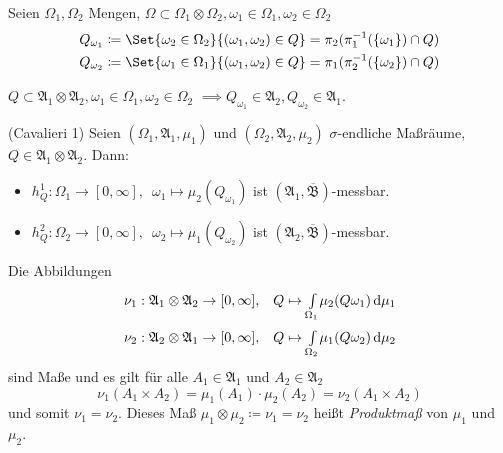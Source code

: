 \documentclass{cheat-sheet}
\newcommand{\Alg}{\mathfrak{A}} %
\newcommand{\Bor}{\mathfrak{B}} %
\begin{document}
\begin{nota}
  Seien $\Omega_1, \Omega_2$ Mengen, $\Omega \subset \Omega_1 \otimes \Omega_2, \omega_1 \in \Omega_1, \omega_2 \in \Omega_2$
  \begin{align*}
    Q_{\omega_1} &\coloneqq \Set{ \omega_2 \in \Omega_2 }{ (\omega_1, \omega_2) \in Q } = \pi_2(\pi_1^{-1}(\{ \omega_1 \}) \cap Q)\\
    Q_{\omega_2} &\coloneqq \Set{ \omega_1 \in \Omega_1 }{ (\omega_1, \omega_2) \in Q } = \pi_1(\pi_2^{-1}(\{ \omega_2 \}) \cap Q)
  \end{align*}
\end{nota}

\begin{satz} %
  $Q \subset \Alg_1 \otimes \Alg_2, \omega_1 \in \Omega_1, \omega_2 \in \Omega_2$
  $\implies Q_{\omega_1} \in \Alg_2, Q_{\omega_2} \in \Alg_1$.
\end{satz}

\begin{satz}(Cavalieri 1) %
  Seien $(\Omega_1, \Alg_1, \mu_1)$ und $(\Omega_2, \Alg_2, \mu_2)$ $\sigma$-endliche Maßräume, $Q \in \Alg_1 \otimes \Alg_2$. Dann:
  \begin{itemize}
    \item $h_Q^1 : \Omega_1 \to [0, \infty], \enspace \omega_1 \mapsto \mu_2(Q_{\omega_1})$ \enspace ist $(\Alg_1, \overline{\Bor})$-messbar.
    \item $h_Q^2 : \Omega_2 \to [0, \infty], \enspace \omega_2 \mapsto \mu_1(Q_{\omega_2})$ \enspace ist $(\Alg_2, \overline{\Bor})$-messbar.
  \end{itemize}
\end{satz}

\begin{satz}
  Die Abbildungen
  \begin{align*}
    \nu_1 : \Alg_1 \otimes \Alg_2 \to [0, \infty], \quad & Q \mapsto \Int{\Omega_1}{}{\mu_2(Q \omega_1)}{\mu_1} \\
    \nu_2 : \Alg_2 \otimes \Alg_1 \to [0, \infty], \quad & Q \mapsto \Int{\Omega_2}{}{\mu_1(Q \omega_2)}{\mu_2}
  \end{align*}
  sind Maße und es gilt für alle $A_1 \in \Alg_1$ und $A_2 \in \Alg_2$
  \[ \nu_1(A_1 \times A_2) = \mu_1(A_1) \cdot \mu_2(A_2) = \nu_2(A_1 \times A_2) \]
  und somit $\nu_1 = \nu_2$. Dieses Maß $\mu_1 \otimes \mu_2 \coloneqq \nu_1 = \nu_2$ heißt \emph{Produktmaß} von $\mu_1$ und $\mu_2$.
\end{satz}
\end{document}
